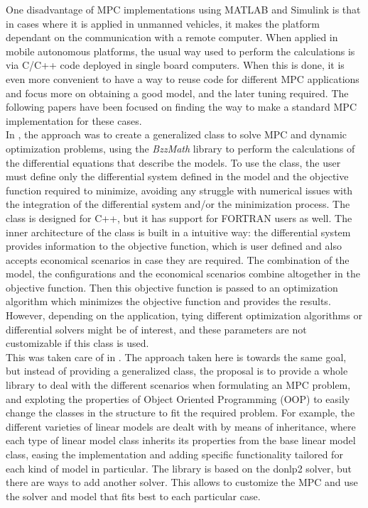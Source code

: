 One disadvantage of MPC implementations using MATLAB \textsuperscript{\textregistered} and Simulink \textsuperscript{\textregistered} is that in cases where it is applied in unmanned vehicles, it makes the platform dependant on the communication with a remote computer. When applied in mobile autonomous platforms, the usual way used to perform the calculations is via C/C++ code deployed in single board computers. When this is done, it is even more convenient to have a way to reuse code for different MPC applications and focus more on obtaining a good model, and the later tuning required. The following papers have been focused on finding the way to make a standard MPC implementation for these cases. \\

In \cite{ref:ManentietAl}, the approach was to create a generalized class to solve MPC and dynamic optimization problems, using the \emph{BzzMath} library to perform the calculations of the differential equations that describe the models. To use the class, the user must define only the differential system defined in the model and the objective function required to minimize, avoiding any struggle with numerical issues with the integration of the differential system and/or the minimization process. The class is designed for C++, but it has support for FORTRAN users as well. The inner architecture of the class is built in a intuitive way: the differential system provides information to the objective function, which is user defined and also accepts economical scenarios in case they are required. The combination of the model, the configurations and the economical scenarios combine altogether in the objective function. Then this objective function is passed to an optimization algorithm which minimizes the objective function and provides the results. However, depending on the application, tying different optimization algorithms or differential solvers might be of interest, and these parameters are not customizable if this class is used.\\

This was taken care of in \cite{ref:DalteetAl}. The approach taken here is towards the same goal, but instead of providing a generalized class, the proposal is to provide a whole library to deal with the different scenarios when formulating an MPC problem, and exploting the properties of Object Oriented Programming (OOP) to easily change the classes in the structure to fit the required problem. For example, the different varieties of linear models are dealt with by means of inheritance, where each type of linear model class inherits its properties from the base linear model class, easing the implementation and adding specific functionality tailored for each kind of model in particular. The library is based on the donlp2 solver, but there are ways to add another solver. This allows to customize the MPC and use the solver and model that fits best to each particular case. \\


